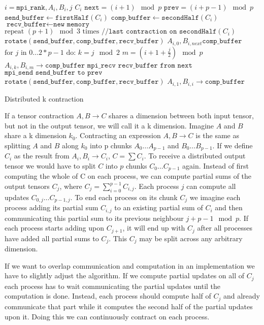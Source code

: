 \begin{algorithm}[ht]

    \begin{algorithmic}
    \Require $i = \texttt{mpi\_rank}, A_i, B_i, j$
    \Ensure $C_i$
    \State $\texttt{next} = (i+1) \mod p$
    \State $\texttt{prev} = (i+p-1) \mod p$
    \State $\texttt{send\_buffer} \gets \texttt{firstHalf}(C_i)$
    \State $\texttt{comp\_buffer} \gets \texttt{secondHalf}(C_i)$
    \State $\texttt{recv\_buffer} \gets \texttt{new memory}$
    \State $\text{repeat } (p+1) \mod 3 \text{ times} \texttt{ //last contraction on secondHalf}(C_i)$ 
    \State \indent $\texttt{rotate}(\texttt{send\_buffer},\texttt{comp\_buffer},\texttt{recv\_buffer})$
    \State $A_{i,0}, B_{i,next} \texttt{comp\_buffer}$
    \State  $\text{for } j \text{ in } 0\dots 2 * p - 1 \text{ do:}$
    \State \indent $ k = j \mod 2 $
    \State \indent $ m = (i + 1 + \frac{j}{2}) \mod p$
    \State \indent {}
    \State \indent \indent $A_{i,k}, B_{i,m} \rightarrow \texttt{comp\_buffer}$
    \State \indent \indent $\texttt{mpi\_recv recv\_buffer from next}$
    \State \indent \indent $\texttt{mpi\_send send\_buffer to prev}$
    \State \indent $\texttt{rotate}(\texttt{send\_buffer},\texttt{comp\_buffer},\texttt{recv\_buffer})$
    \State $A_{i,1}, B_{i,i} \rightarrow \texttt{comp\_buffer}$

\end{algorithmic}
\caption{Distributed k contraction}
\label{alg:k_pseudocode}
\end{algorithm}

If a tensor contraction $A,B \rightarrow C$ shares a dimension between both input tensor, but not in the output tensor, we will call it a k dimension.
Imagine $A$ and $B$ share a k dimension $k_0$.
Contracting an expression $A,B \rightarrow C$ is the same as splitting $A$ and $B$ along $k_0$ into p chunks $A_0\dots A_{p-1}$ and $B_0\dots B_{p-1}$.
If we define $C_i$ as the result from $A_i,B_i \rightarrow C_i$, $C=\sum{C_i}$.
To receive a distributed output tensor we would have to split $C$ into $p$ chunks $C_0\dots C_{p-1}$ again.
Instead of first computing the whole of C on each process, we can compute partial sums of the output tensors $C_j$, where 
$C_j = \sum_{i=0}^{p-1} C_{i,j}$.
Each process $j$ can compute all updates $C_{0,j}\dots C_{p-1,j}$.
To end each process on its chunk $C_j$ we imagine each process adding its partial sum $C_{i,j}$ to an existing partial sum of $C_i$ and then communicating this partial sum to its previous neighbour $j+p-1 \mod p$.
If each process starts adding upon $C_{j+1}$, it will end up with $C_j$ after all processes have added all partial sums to $C_j$.
This $C_j$ may be split across any arbitrary dimension.

If we want to overlap communication and computation in an implementation we have to slightly adjust the algorithm.
If we compute partial updates on all of $C_j$ each process has to wait communicating the partial updates until the computation is done.
Instead, each process should compute half of $C_j$ and already communicate that part while it computes the second half of the partial updates upon it.
Doing this we can continuously contract on each process.